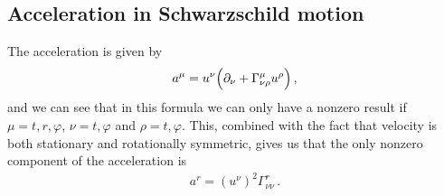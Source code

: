 \documentclass[main.tex]{subfiles}
\begin{document}
\subsection{Acceleration in Schwarzschild motion}

The acceleration is given by 
%
\begin{align}
  a^{\mu } = u^{\nu } \qty(\partial_{\nu } + \Gamma^{\mu  }_{\nu \rho } u^{\rho })
\,,
\end{align}
%
and we can see that in this formula we can only have a nonzero result if \(\mu = t, r, \varphi \), \(\nu = t, \varphi \) and \(\rho = t, \varphi \). 
This, combined with the fact that velocity is both stationary and rotationally symmetric, gives us that the only nonzero component of the acceleration is 
%
\begin{align}
  a^{r } = (u^{\nu })^2 \Gamma^{r}_{\nu \nu }
\,.
\end{align}
%
 
\end{document}
